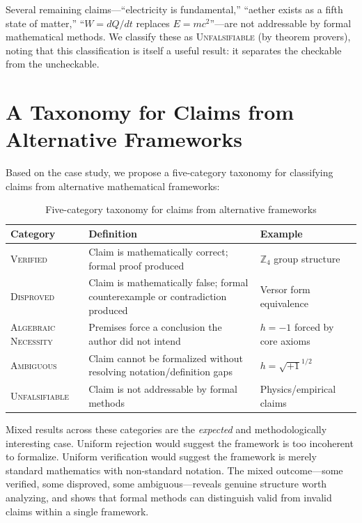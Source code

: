\documentclass[runningheads]{llncs}
\begin{document}
Several remaining claims---``electricity is fundamental,''
``aether exists as a fifth state of matter,'' ``$W = dQ/dt$ replaces
$E = mc^2$''---are not addressable by formal mathematical methods. We classify
these as \textsc{Unfalsifiable} (by theorem provers), noting that this
classification is itself a useful result: it separates the checkable from the
uncheckable.

\section{A Taxonomy for Claims from Alternative Frameworks}
\label{sec:taxonomy}

Based on the case study, we propose a five-category taxonomy for classifying
claims from alternative mathematical frameworks:

\begin{table}[ht]
\centering
\caption{Five-category taxonomy for claims from alternative frameworks}
\label{tab:taxonomy}
\begin{tabular}{@{}lp{4.5cm}p{4cm}@{}}
\toprule
\textbf{Category} & \textbf{Definition} & \textbf{Example} \\
\midrule
\textsc{Verified} & Claim is mathematically correct; formal proof produced &
  $\mathbb{Z}_4$ group structure \\
\textsc{Disproved} & Claim is mathematically false; formal counterexample or
  contradiction produced & Versor form equivalence \\
\textsc{Algebraic Necessity} & Premises force a conclusion the author did not
  intend & $h = -1$ forced by core axioms \\
\textsc{Ambiguous} & Claim cannot be formalized without resolving
  notation/definition gaps & $h = \sqrt{+1}^{1/2}$ \\
\textsc{Unfalsifiable} & Claim is not addressable by formal methods &
  Physics/empirical claims \\
\bottomrule
\end{tabular}
\end{table}

Mixed results across these categories are the \emph{expected} and
methodologically interesting case. Uniform rejection would suggest the framework
is too incoherent to formalize. Uniform verification would suggest the framework
is merely standard mathematics with non-standard notation. The mixed outcome---some
verified, some disproved, some ambiguous---reveals genuine structure worth
analyzing, and shows that formal methods can distinguish valid from invalid
claims within a single framework.
\end{document}
